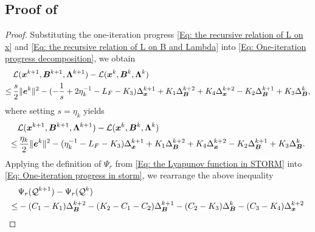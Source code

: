 \subsection{Proof of }
\label{Subsubsec: proof descent STORM}
\begin{proof}
    Substituting the one-iteration progress \eqref{Eq: the recursive relation of L on x}
    and \eqref{Eq: the recursive relation of L on B and Lambda} into \eqref{Eq: One-iteration progress decomposition},
    we obtain
    \begin{align}
        & \mathcal{L} (\bm{x}^{k+1}, \bm{B}^{k+1}, \bm{\Lambda}^{k+1}) - \mathcal{L} (\bm{x}^{k}, \bm{B}^{k}, \bm{\Lambda}^{k}) \notag                                                                                                        \\
        \leq \,                                          & \frac{s}{2}\| \bm{e}^{k}\|^{2}- (-\frac{1}{s}+ 2\eta_{k}^{-1}- L_{F}- K_{3}) \Delta_{\bm{x}}^{k+1}+ K_{1}\Delta_{\bm{B}}^{k+2}+ K_{4}\Delta_{\bm{x}}^{k+2}- K_{2}\Delta_{\bm{B}}^{k+1}+ K_{3}\Delta_{\bm{B}}^{k}, \notag
    \end{align}
    where setting $s = \eta_{k}$ yields
    \begin{align}
             & \mathcal{L} (\bm{x}^{k+1}, \bm{B}^{k+1}, \bm{\Lambda}^{k+1}) - \mathcal{L} (\bm{x}^{k}, \bm{B}^{k}, \bm{\Lambda}^{k}) \nonumber                                                                                                                                          \\
        \leq & \,\frac{\eta_{k}}{2}\| \bm{e}^{k}\|^{2}- (\eta_{k}^{-1}- L_{F}- K_{3}) \Delta_{\bm{x}}^{k+1}+ K_{1}\Delta_{\bm{B}}^{k+2}+ K_{4}\Delta_{\bm{x}}^{k+2}- K_{2}\Delta_{\bm{B}}^{k+1}+ K_{3}\Delta_{\bm{B}}^{k}.\label{Eq: One-iteration progress in storm}
    \end{align}
    Applying the definition of $\Psi_r$ from \eqref{Eq: the Lyapunov function in STORM}
    into \eqref{Eq: One-iteration progress in storm}, we rearrange the above
    inequality
    \begin{align}
        \label{the descent property of Lyapunov func in STORM first} & \Psi_r(\mathcal{Q}^{k+1}) - \Psi_r(\mathcal{Q}^{k}) \notag                                                                                         \\
        \leq                                                         & - (C_{1}- K_{1}) \Delta_{\bm{B}}^{k+2}-(K_{2}- C_{1}- C_{2}) \Delta_{\bm{B}}^{k+1}- (C_{2}- K_{3}) \Delta_{\bm{B}}^{k}- (C_{3}-K_{4}) \Delta_{\bx}^{k+2}\notag \\

\end{align}
\end{proof}
